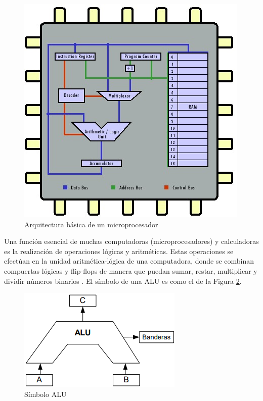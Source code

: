 \documentclass[journal]{IEEEtran}
\begin{document}
	\begin{figure}[hbtp]
		\centering
		\includegraphics[scale = 0.5]{img/microprocesador.jpg}
		\caption{Arquitectura básica de un microprocesador \cite{Gonzalez2017}}
		\label{fig:microprocesador}
	\end{figure}
	
	Una función esencial de muchas computadoras (microprocesadores) y calculadoras es la realización de operaciones lógicas y aritméticas. Estas operaciones se efectúan en la unidad aritmética-lógica de una computadora, donde se combinan compuertas lógicas y flip-flops de manera que puedan sumar, restar, multiplicar y dividir números binarios \cite{Tocci2007}. El símbolo de una ALU es como el de la Figura \ref{fig:simboloalu}.
	
	\begin{figure}[!htb]
		\centering
		\includegraphics[scale = 0.5]{img/simboloalu.png}
		\caption{Símbolo ALU \cite{Garcia}}
		\label{fig:simboloalu}
	\end{figure}
	
\end{document}
